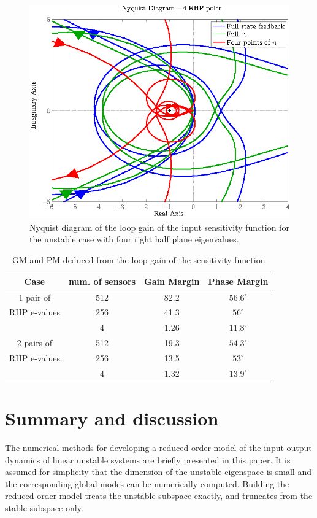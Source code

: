 \documentclass[12pt,lot, lof]{puthesis}
\begin{document}
\begin{figure}[htb]
\centering
\includegraphics[width=0.67 \linewidth]{robust2}
\caption{Nyquist diagram of the loop gain of the input sensitivity function for the unstable case with four right half plane eigenvalues.}
  \label{rob2}
\end{figure}


\begin{table}[htbp]
	\caption{GM and PM deduced from the loop gain of the sensitivity function}
	\label{table3}
	\begin{tabular}{|c|c|c|c|} \hline
		Case & num. of sensors & Gain Margin & Phase Margin \\ \hline
		1 pair of  & 512&82.2&$56.6^\circ$   \\ 
		RHP e-values  & 256& 41.3&$56 ^\circ $\\ 
		  &4 & 1.26& $11.8^\circ$ \\ \hline
		2 pairs of  &512 &19.3 &$54.3^\circ$ \\ 
		RHP e-values  &256 & 13.5& $53^\circ$ \\ 
		  &4 & 1.32& $13.9^\circ$\\ \hline
	\end{tabular}
\end{table}

\clearpage

\section{Summary and discussion}
 \label{Conclusion}
 The numerical methods for developing a reduced-order model of the input-output dynamics of linear unstable systems are briefly presented in this paper. It is assumed for simplicity that the dimension of the unstable eigenspace is small and the corresponding global modes can be numerically computed. Building the reduced order model treats the unstable subspace exactly, and truncates from the stable subspace only.
 
\end{document}
